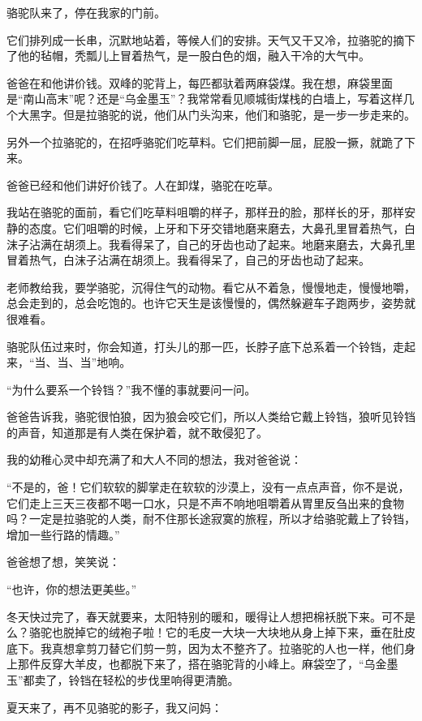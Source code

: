 \par 骆驼队来了，停在我家的门前。
\par 它们排列成一长串，沉默地站着，等候人们的安排。天气又干又冷，拉骆驼的摘下了他的毡帽，秃瓢儿上冒着热气，是一股白色的烟，融入干冷的大气中。
\par 爸爸在和他讲价钱。双峰的驼背上，每匹都驮着两麻袋煤。我在想，麻袋里面是“南山高末”呢？还是“乌金墨玉”？我常常看见顺城街煤栈的白墙上，写着这样几个大黑字。但是拉骆驼的说，他们从门头沟来，他们和骆驼，是一步一步走来的。
\par 另外一个拉骆驼的，在招呼骆驼们吃草料。它们把前脚一屈，屁股一撅，就跪了下来。
\par 爸爸已经和他们讲好价钱了。人在卸煤，骆驼在吃草。
\par 我站在骆驼的面前，看它们吃草料咀嚼的样子，那样丑的脸，那样长的牙，那样安静的态度。它们咀嚼的时候，上牙和下牙交错地磨来磨去，大鼻孔里冒着热气，白沫子沾满在胡须上。我看得呆了，自己的牙齿也动了起来。地磨来磨去，大鼻孔里冒着热气，白沫子沾满在胡须上。我看得呆了，自己的牙齿也动了起来。
\par 老师教给我，要学骆驼，沉得住气的动物。看它从不着急，慢慢地走，慢慢地嚼，总会走到的，总会吃饱的。也许它天生是该慢慢的，偶然躲避车子跑两步，姿势就很难看。
\par 骆驼队伍过来时，你会知道，打头儿的那一匹，长脖子底下总系着一个铃铛，走起来，“当、当、当”地响。
\par “为什么要系一个铃铛？”我不懂的事就要问一问。
\par 爸爸告诉我，骆驼很怕狼，因为狼会咬它们，所以人类给它戴上铃铛，狼听见铃铛的声音，知道那是有人类在保护着，就不敢侵犯了。
\par 我的幼稚心灵中却充满了和大人不同的想法，我对爸爸说：
\par “不是的，爸！它们软软的脚掌走在软软的沙漠上，没有一点点声音，你不是说，它们走上三天三夜都不喝一口水，只是不声不响地咀嚼着从胃里反刍出来的食物吗？一定是拉骆驼的人类，耐不住那长途寂寞的旅程，所以才给骆驼戴上了铃铛，增加一些行路的情趣。”
\par 爸爸想了想，笑笑说：
\par “也许，你的想法更美些。”
\par 冬天快过完了，春天就要来，太阳特别的暖和，暖得让人想把棉袄脱下来。可不是么？骆驼也脱掉它的绒袍子啦！它的毛皮一大块一大块地从身上掉下来，垂在肚皮底下。我真想拿剪刀替它们剪一剪，因为太不整齐了。拉骆驼的人也一样，他们身上那件反穿大羊皮，也都脱下来了，搭在骆驼背的小峰上。麻袋空了，“乌金墨玉”都卖了，铃铛在轻松的步伐里响得更清脆。
\par 夏天来了，再不见骆驼的影子，我又问妈：
